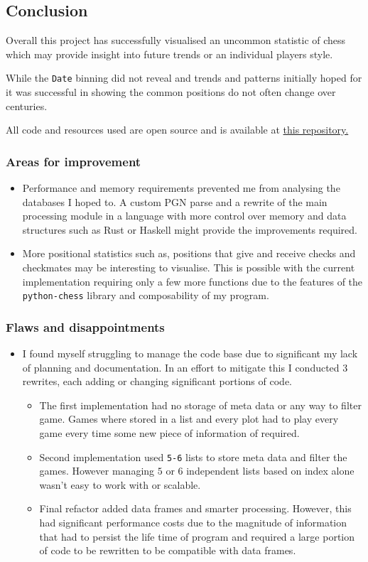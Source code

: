 \documentclass[11pt]{article}
\begin{document}
\subsection{Conclusion}
\label{sec:orgb793f33}
Overall this project has successfully visualised an uncommon statistic of chess which may provide insight into future trends or an individual players style.

While the \texttt{Date} binning did not reveal and trends and patterns initially hoped for it was successful in showing the common positions do not often change over centuries.

All code and resources used are open source and is available at \href{https://github.com/Jake-Moss/chess-analysis}{this repository.}
\subsubsection{Areas for improvement}
\label{sec:orgceee7fc}
\begin{itemize}
\item Performance and memory requirements prevented me from analysing the databases I hoped to. A custom PGN parse and a rewrite of the main processing module in a language with more control over memory and data structures such as Rust or Haskell might provide the improvements required.
\item More positional statistics such as, positions that give and receive checks and checkmates may be interesting to visualise. This is possible with the current implementation requiring only a few more functions due to the features of the \texttt{python-chess} library and composability of my program.
\end{itemize}
\subsubsection{Flaws and disappointments}
\label{sec:orga6e00be}
\begin{itemize}
\item I found myself struggling to manage the code base due to significant my lack of planning and documentation. In an effort to mitigate this I conducted 3 rewrites, each adding or changing significant portions of code.
\begin{itemize}
\item The first implementation had no storage of meta data or any way to filter game. Games where stored in a list and every plot had to play every game every time some new piece of information of required.
\item Second implementation used \texttt{5-6} lists to store meta data and filter the games. However managing \(5\) or \(6\) independent lists based on index alone wasn't easy to work with or scalable.
\item Final refactor added data frames and smarter processing. However, this had significant performance costs due to the magnitude of information that had to persist the life time of program and required a large portion of code to be rewritten to be compatible with data frames.
\end{itemize}
\end{itemize}
\end{document}
